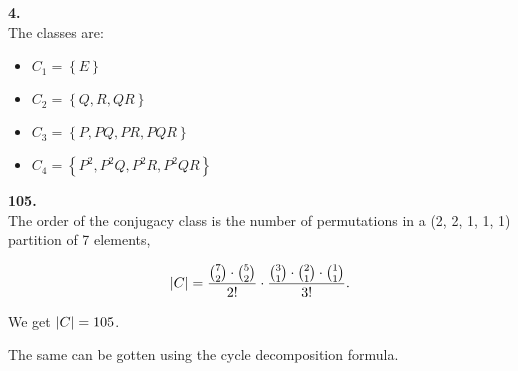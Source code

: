 \begin{alphaparts}
    \questionpart
    \textbf{4.} \\
    The classes are:
    \begin{itemize}
        \item $C_1 = \left\{E\right\}$
        \item $C_2 = \left\{Q, R, QR\right\}$
        \item $C_3 = \left\{P, PQ, PR, PQR\right\}$
        \item $C_4 = \left\{P^2, P^2Q, P^2R, P^2QR\right\}$
    \end{itemize}

    \questionpart
    \textbf{105.} \\
    The order of the conjugacy class is the number of permutations
    in a (2, 2, 1, 1, 1) partition of 7 elements,

    \begin{equation}
        \absolutevalue{C} = \frac{\binom{7}{2} \cdot \binom{5}{2}}{2!} 
                    \cdot \frac{\binom{3}{1} \cdot \binom{2}{1} \cdot \binom{1}{1}}{3!} .
        \nonumber 
    \end{equation}
    
    We get $\absolutevalue{C} = 105$. 

    The same can be gotten using the cycle decomposition formula.

\end{alphaparts}